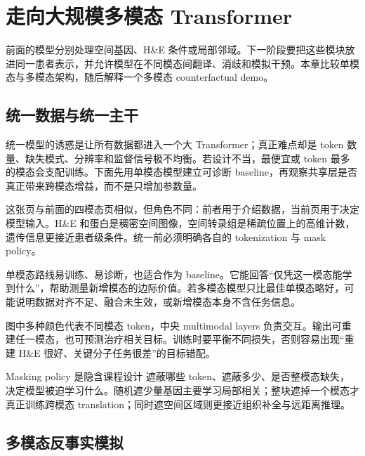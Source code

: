 \section{走向大规模多模态 Transformer}

前面的模型分别处理空间基因、H\&E 条件或局部邻域。下一阶段要把这些模块放进同一患者表示，并允许模型在不同模态间翻译、消歧和模拟干预。本章比较单模态与多模态架构，随后解释一个多模态 counterfactual demo。

\subsection{统一数据与统一主干}

统一模型的诱惑是让所有数据都进入一个大 Transformer；真正难点却是 token 数量、缺失模式、分辨率和监督信号极不均衡。若设计不当，最便宜或 token 最多的模态会支配训练。下面先用单模态模型建立可诊断 baseline，再观察共享层是否真正带来跨模态增益，而不是只增加参数量。


这张页与前面的四模态页相似，但角色不同：前者用于介绍数据，当前页用于决定模型输入。H\&E 和蛋白是稠密空间图像，空间转录组是稀疏位置上的高维计数，遗传信息更接近患者级条件。统一前必须明确各自的 tokenization 与 mask policy。


单模态路线易训练、易诊断，也适合作为 baseline。它能回答“仅凭这一模态能学到什么”，帮助测量新增模态的边际价值。若多模态模型只比最佳单模态略好，可能说明数据对齐不足、融合未生效，或新增模态本身不含任务信息。


图中多种颜色代表不同模态 token，中央 multimodal layers 负责交互。输出可重建任一模态，也可预测治疗相关目标。训练时要平衡不同损失，否则容易出现“重建 H\&E 很好、关键分子任务很差”的目标错配。

\begin{knowledgebox}{Masking policy 是隐含课程设计}
遮蔽哪些 token、遮蔽多少、是否整模态缺失，决定模型被迫学习什么。随机遮少量基因主要学习局部相关；整块遮掉一个模态才真正训练跨模态 translation；同时遮空间区域则更接近组织补全与远距离推理。
\end{knowledgebox}

\subsection{多模态反事实模拟}

